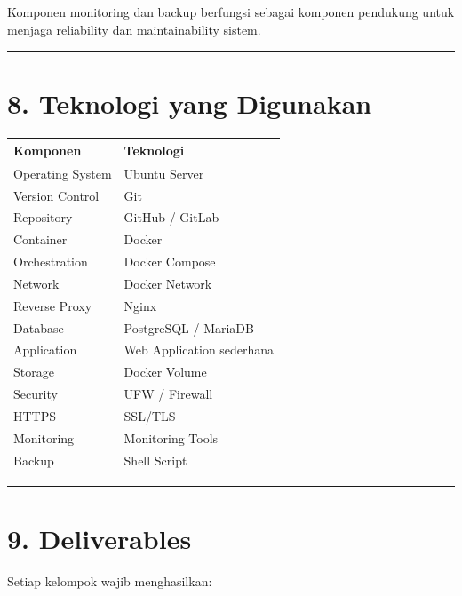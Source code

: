 \documentclass[
]{article}
\begin{document}
Komponen monitoring dan backup berfungsi sebagai komponen pendukung
untuk menjaga reliability dan maintainability sistem.

\begin{center}\rule{0.5\linewidth}{0.5pt}\end{center}

\section{8. Teknologi yang Digunakan}\label{teknologi-yang-digunakan}

\begin{longtable}[]{@{}ll@{}}
\toprule\noalign{}
Komponen & Teknologi \\
\midrule\noalign{}
\endhead
\bottomrule\noalign{}
\endlastfoot
Operating System & Ubuntu Server \\
Version Control & Git \\
Repository & GitHub / GitLab \\
Container & Docker \\
Orchestration & Docker Compose \\
Network & Docker Network \\
Reverse Proxy & Nginx \\
Database & PostgreSQL / MariaDB \\
Application & Web Application sederhana \\
Storage & Docker Volume \\
Security & UFW / Firewall \\
HTTPS & SSL/TLS \\
Monitoring & Monitoring Tools \\
Backup & Shell Script \\
\end{longtable}

\begin{center}\rule{0.5\linewidth}{0.5pt}\end{center}

\section{9. Deliverables}\label{deliverables}

Setiap kelompok wajib menghasilkan:
\end{document}
